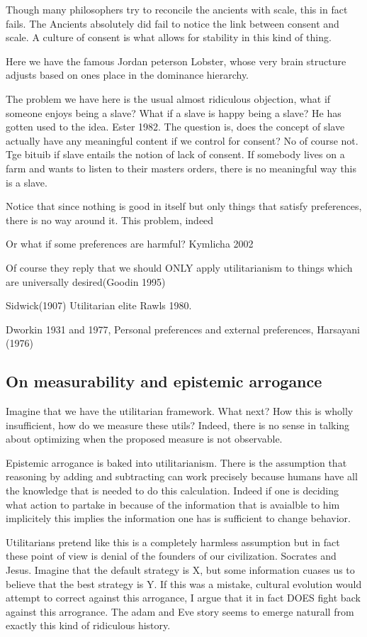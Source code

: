 Though many philosophers try to reconcile the ancients with scale, this in fact fails. The Ancients absolutely did fail to notice the link between consent and scale. A culture of consent is what allows for stability in this kind of thing. 

Here we have the famous Jordan peterson Lobster, whose very brain structure adjusts based on ones place in the dominance hierarchy. 

The problem we have here is the usual almost ridiculous objection, what if someone enjoys being a slave? What if a slave is happy being a slave? He has gotten used to the idea. Ester 1982. The question is, does the concept of slave actually have any meaningful content if we control for consent? No of course not. Tge bituib if slave entails the notion of lack of consent. If somebody lives on a farm and wants to listen to their masters orders, there is no meaningful way this is a slave. 


Notice that since nothing is good in itself but only things that satisfy preferences, there is no way around it. This problem, indeed 



Or what if some preferences are harmful? Kymlicha 2002

Of course they reply that we should ONLY apply utilitarianism to things which are universally desired(Goodin 1995)

Sidwick(1907) Utilitarian elite Rawls 1980. 

Dworkin 1931 and 1977, Personal preferences and external preferences, Harsayani (1976)


\subsection{On measurability and epistemic arrogance}
Imagine that we have the utilitarian framework. What next? How this is wholly insufficient, how do we measure these utils? Indeed, there is no sense in talking about optimizing when the proposed measure is not observable. 

Epistemic arrogance is baked into utilitarianism. There is the assumption that reasoning by adding and subtracting can work precisely because humans have all the knowledge that is needed to do this calculation. Indeed if one is deciding what action to partake in because of the information that is avaialble to him implicitely this implies the information one has is sufficient to change behavior. 

Utilitarians pretend like this is a completely harmless assumption but in fact these point of view is denial of the founders of our civilization. Socrates and Jesus. Imagine that the default strategy is X, but some information cuases us to believe that the best strategy is Y. If this was a mistake, cultural evolution would attempt to correct against this arrogance, I argue that it in fact DOES fight back against this arrogrance. The adam and Eve story seems to emerge naturall from exactly this kind of ridiculous history. 

